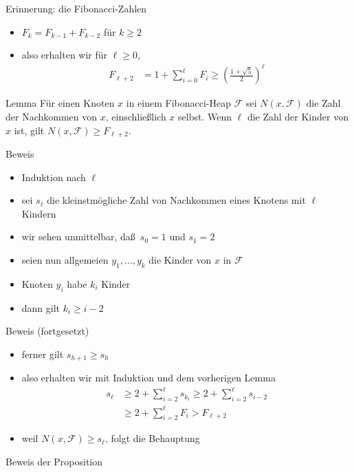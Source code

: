 \documentclass[aspectratio=1610, 11pt]{beamer}
\newcommand\cF{\mathcal F}
\newcommand\bc[1]{\left({#1}\right)}
\newcommand\bcfr[2]{\bc{\frac{#1}{#2}}}
\begin{document}
\begin{frame}
\begin{overprint}
\begin{exampleblock}{Erinnerung: die Fibonacci-Zahlen}
\begin{itemize}
				\item $F_k=F_{k-1}+F_{k-2}$ f\"ur $k\geq2$
				\item also erhalten wir f\"ur $\ell\geq0$,
					\begin{align*}
						F_{\ell+2}&=1+\sum_{i=0}^\ell F_i\geq\bcfr{1+\sqrt 5}2^\ell
					\end{align*}
			\end{itemize}
		\end{exampleblock}
		\begin{block}{Lemma}
			F\"ur einen Knoten $x$ in einem Fibonacci-Heap $\cF$ sei $N(x,\cF)$ die Zahl der Nachkommen von $x$, einschlie\ss lich $x$ selbst. Wenn $\ell$ die Zahl der Kinder von $x$ ist, gilt $ N(x,\cF)\geq F_{\ell+2} $.
		\end{block}
		\begin{exampleblock}{Beweis}
			\begin{itemize}
				\item Induktion nach $\ell$
				\item sei $s_\ell$ die kleinstm\"ogliche Zahl von Nachkommen eines Knotens mit $\ell$ Kindern
				\item wir sehen unmittelbar, da\ss\ $s_0=1$ und $s_1=2$
				\item seien nun allgemeien $y_1,\ldots,y_k$ die Kinder von $x$ in $\cF$
				\item Knoten $y_i$ habe $k_i$ Kinder
				\item dann gilt $k_i\geq i-2$
			\end{itemize}
		\end{exampleblock}
		\begin{exampleblock}{Beweis (fortgesetzt)}
			\begin{itemize}
				\item ferner gilt $s_{h+1}\geq s_h$
				\item also erhalten wir mit Induktion und dem vorherigen Lemma
					\begin{align*}
						s_\ell&\geq2+\sum_{i=2}^\ell s_{k_i}\geq2+\sum_{i=2}^\ell s_{i-2}\\
							  &\geq2+\sum_{i=2}^\ell F_{i}>F_{\ell+2}
					\end{align*}
				\item weil $N(x,\cF)\geq s_\ell$, folgt die Behauptung
			\end{itemize}
		\end{exampleblock}
		\begin{exampleblock}{Beweis der Proposition}
			\begin{itemize}

\end{itemize}
\end{exampleblock}
\end{overprint}
\end{frame}
\end{document}
